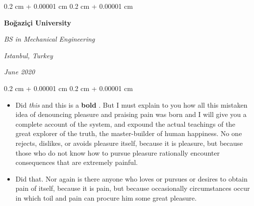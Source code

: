 \documentclass[10pt, letterpaper]{article}
\newenvironment{highlights}{
    \begin{itemize}[
        topsep=0.10 cm,
        parsep=0.10 cm,
        partopsep=0pt,
        itemsep=0pt,
        leftmargin=0.4 cm + 10pt
    ]
}{
    \end{itemize}
} %
\newenvironment{onecolentry}{
    \begin{adjustwidth}{
        0.2 cm + 0.00001 cm
    }{
        0.2 cm + 0.00001 cm
    }
}{
    \end{adjustwidth}
} %
\newenvironment{twocolentry}[2][]{
    \onecolentry
    \def\secondColumn{#2}
    \setcolumnwidth{\fill, 4.5 cm}
    \begin{paracol}{2}
}{
    \switchcolumn \raggedleft \secondColumn
    \end{paracol}
    \endonecolentry
} %
\let\hrefWithoutArrow\href
\renewcommand{\href}[2]{\hrefWithoutArrow{#1}{\ifthenelse{\equal{#2}{}}{ }{#2 }\raisebox{.15ex}{\footnotesize \faExternalLink*}}}
\begin{document}
        \begin{twocolentry}{
        \textit{Istanbul, Turkey}    
            
        \textit{June 2020}}
            \textbf{Boğaziçi University}

            \textit{BS in Mechanical Engineering}
        \end{twocolentry}
        \vspace{0.10 cm}
        \begin{onecolentry}
            \begin{highlights}
                \item Did \textit{this} and this is a \textbf{bold} \href{https://example.com}{link}. But I must explain to you how all this mistaken idea of denouncing pleasure and praising pain was born and I will give you a complete account of the system, and expound the actual teachings of the great explorer of the truth, the master-builder of human happiness. No one rejects, dislikes, or avoids pleasure itself, because it is pleasure, but because those who do not know how to pursue pleasure rationally encounter consequences that are extremely painful.
                \item Did that. Nor again is there anyone who loves or pursues or desires to obtain pain of itself, because it is pain, but because occasionally circumstances occur in which toil and pain can procure him some great pleasure.
            \end{highlights}
        \end{onecolentry}


        \vspace{0.2 cm}
\end{document}
